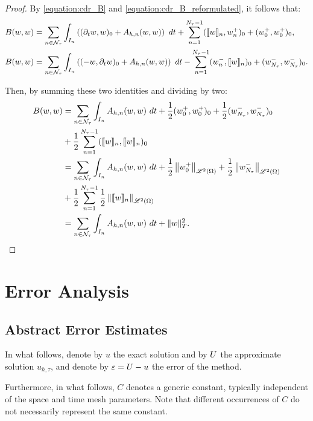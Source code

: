 \begin{proof}
    By \cref{equation:cdr_B} and \cref{equation:cdr_B_reformulated}, it follows that:
    \begin{align*}
        B(w, w) &= \sum_{n \in \mathcal{N}_{\tau}} \int_{I_n} \left( (\partial_t w, w )_0 + A_{h, n}(w, w) \right) ~ dt + \sum_{n = 1}^{N_{\tau} - 1} (\llbracket w \rrbracket_n, w_n^+ )_0 + (w_0^+, w_0^+ )_0, \\
        B(w, w) &= \sum_{n \in \mathcal{N}_{\tau}} \int_{I_n} \left( (-w, \partial_t w )_0 + A_{h, n}(w, w) \right) ~ dt - \sum_{n = 1}^{N_{\tau} - 1} (w_n^-, \llbracket w \rrbracket_n )_0 + (w_{N_{\tau}}^-, w_{N_{\tau}}^-)_0.
    \end{align*}

    Then, by summing these two identities and dividing by two:
    \begin{align*}
        B(w, w) &= \sum_{n \in \mathcal{N}_{\tau}} \int_{I_n} A_{h, n}(w, w) ~ dt + \frac12 (w_0^+, w_0^+ )_0 + \frac12 (w_{N_{\tau}}^-, w_{N_{\tau}}^-)_0 \\
        &+ \frac12 \sum_{n = 1}^{N_{\tau} - 1} (\llbracket w \rrbracket_n, \llbracket w \rrbracket_n )_0 \\
        &= \sum_{n \in \mathcal{N}_{\tau}} \int_{I_n} A_{h, n}(w, w) ~ dt + \frac12 \left\lVert w_0^+ \right\rVert_{\mathscr{L}^{2}(\Omega)} + \frac12 \left\lVert w_{N_{\tau}}^- \right\rVert_{\mathscr{L}^{2}(\Omega)} \\
        &+ \frac12 \sum_{n = 1}^{N_{\tau} - 1} \frac12 \left\lVert  \llbracket w \rrbracket_n  \right\rVert_{\mathscr{L}^{2}(\Omega)} \\
        &= \sum_{n \in \mathcal{N}_{\tau}} \int_{I_n} A_{h, n}(w, w) ~ dt + \lVert w \rVert_{T}^2.
    \end{align*}
\end{proof}

\newpage
\section{Error Analysis} \label{sec:cdr_error_analysis}

\subsection{Abstract Error Estimates} \label{subsection:error_estimates}

In what follows, denote by $u$ the exact solution and by $U$ the approximate solution $u_{h, \tau}$, and denote by $\varepsilon = U - u$ the error of the method.

Furthermore, in what follows, $C$ denotes a generic constant, typically independent of the space and time mesh parameters. Note that different occurrences of $C$ do not necessarily represent the same constant.

